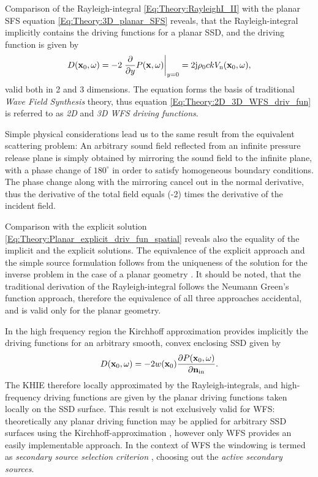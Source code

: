 Comparison of the Rayleigh-integral \eqref{Eq:Theory:RayleighI_II} with the planar SFS equation \eqref{Eq:Theory:3D_planar_SFS} reveals, that the Rayleigh-integral implicitly contains the driving functions for a planar SSD, 
 and the driving function is given by
\begin{equation}
D(\mathbf{x}_0,\omega) = -2 \left. \frac{\partial}{\partial y} P(\mathbf{x},\omega) \right|_{y = 0} = 2 \mathrm{j} \rho_0 c k V_{\mathrm{n}}(\mathbf{x}_0,\omega),
\label{Eq:Theory:2D_3D_WFS_driv_fun}
\end{equation}
valid both in 2 and 3 dimensions.
The equation forms the basis of traditional \emph{Wave Field Synthesis} theory, thus equation \eqref{Eq:Theory:2D_3D_WFS_driv_fun} is referred to as \emph{2D} and \emph{3D WFS driving functions}.

Simple physical considerations lead us to the same result from the equivalent scattering problem:
An arbitrary sound field reflected from an infinite pressure release plane is simply obtained by mirroring the sound field to the infinite plane, with a phase change of $180^{\circ}$ in order to satisfy homogeneous boundary conditions. The phase change along with the mirroring cancel out in the normal derivative, thus the derivative of the total field equals (-2) times the derivative of the incident field.

Comparison with the explicit solution \eqref{Eq:Theory:Planar_explicit_driv_fun_spatial} reveals also the equality of the implicit and the explicit solutions.
The equivalence of the explicit approach and the simple source formulation follows from the uniqueness of the solution for the inverse problem in the case of a planar geometry \cite{Fazi2010}.
It should be noted, that the traditional derivation of the Rayleigh-integral follows the Neumann Green's function approach, therefore the equivalence of all three approaches accidental, and is valid only for the planar geometry.

\vspace{3mm}
In the high frequency region the Kirchhoff approximation provides implicitly the driving functions for an arbitrary smooth, convex enclosing SSD given by
\begin{equation}
D(\mathbf{x}_0,\omega) = - 2w(\mathbf{x}_0)\frac{\partial P(\mathbf{x}_0,\omega)}{\partial \mathbf{n}_{\mathrm{in}}}.
\label{eq:theory:gen_WFS}
\end{equation}
The KHIE therefore locally approximated by the Rayleigh-integrals, and high-frequency driving functions are given by the planar driving functions taken locally on the SSD surface.
This result is not exclusively valid for WFS: theoretically any planar driving function may be applied for arbitrary SSD surfaces using the Kirchhoff-approximation \cite{Ahrens2012}, however only WFS provides an easily implementable approach.
In the context of WFS the windowing is termed as \emph{secondary source selection criterion} \cite{Spors2007, Spors2007:DAGA:SS_selection_criterion}, choosing out the \emph{active secondary sources}. 

